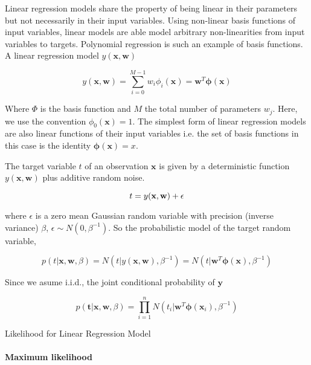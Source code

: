 Linear regression models share the property of being linear in their parameters but not necessarily in their input variables.
Using non-linear basis functions of input variables, linear models are able model arbitrary non-linearities from input variables to targets.  
Polynomial regression is such an example of basis functions.
A linear regression model $y(\bm{x},\bm{w})$

\begin{equation}
y(\bm{x},\bm{w}) = \sum_{i=0}^{M-1} w_i \phi_i(\bm{x}) = \bm{w}^T \bm{\phi}(\bm{x})
\end{equation}

Where $\Phi$ is the basis function and $M$ the total number of parameters $w_j$.
Here, we use the convention $\phi_0(\bm{x})=1$.
The simplest form of linear regression models are also linear functions of their input variables i.e. the set of basis functions in this case is the identity $\bm{\phi}(\bm{x})=x$. 

The target variable $t$ of an observation $\bm{x}$ is given by a deterministic function $y(\bm{x},\bm{w})$ plus additive random noise.

\begin{equation}
 t = y(\mathbf{x},\mathbf{w}) + \epsilon
\end{equation}

where $\epsilon$ is a zero mean Gaussian random variable with precision (inverse variance) $\beta$, $\epsilon \sim N(0,\beta^{-1})$.
So the probabilistic model of the target random variable,

\begin{equation}
p(t | \bm{x}, \bm{w}, \beta) = N(t | y(\bm{x},\bm{w}), \beta^{-1}) = N(t | \bm{w}^T \bm{\phi}(\bm{x}) , \beta^{-1})
\end{equation}

Since we asume i.i.d., the joint conditional probability of $\bm{y}$

\begin{equation}
p(\bm{t} | \bm{x}, \bm{w}, \beta) = \prod_{i=1}^n N(t_i | \bm{w}^T \bm{\phi}(\bm{x}_i) , \beta^{-1})
\end{equation}


\begin{algorithm}[H]
  \caption{Likelihood for Linear Regression Model}
  \label{alg:likelihood_for_linear_regression_model}
  
\end{algorithm}


\paragraph{Maximum likelihood}

